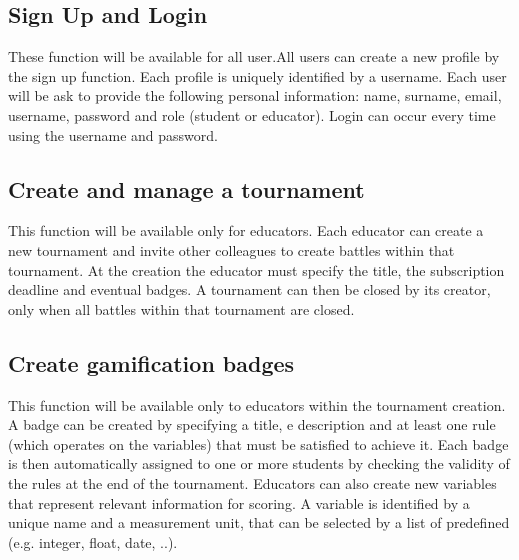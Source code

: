 \subsection{Sign Up and Login}
These function will be available for all user.\newline All users can create a new profile by the sign up function. Each profile is uniquely identified by a username. Each user will be ask to provide the following personal information: name, surname, email, username, password and role (student or educator). \newline
Login can occur every time using the username and password.

\subsection{Create and manage a tournament}
This function will be available only for educators. \newline
Each educator can create a new tournament and invite other colleagues to create battles within that tournament. At the creation the educator must specify the title, the subscription deadline and eventual badges. \newline
A tournament can then be closed by its creator, only when all battles within that tournament are closed.

\subsection{Create gamification badges}
This function will be available only to educators within the tournament creation. 
\newline 
A badge can be created by specifying a title, e description and at least one rule (which operates on the variables) that must be satisfied to achieve it. Each badge is then automatically assigned to one or more students by checking the validity of the rules at the end of the tournament. Educators can also create new variables that represent relevant information for scoring. A variable is identified by a unique name and a measurement unit, that can be selected by a list of predefined (e.g. integer, float, date, ..).

